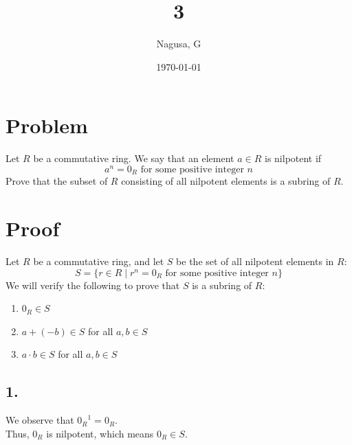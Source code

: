 \documentclass[11pt, a4paper]{article}
\title{3}
\author{Nagusa, G}
\date{\today}
\begin{document}
\maketitle

\section*{Problem}
Let $R$ be a commutative ring.
We say that an element $a \in R$ is nilpotent if
\[
a^n = 0_R \text{ for some positive integer } n
\]
Prove that the subset of $R$ consisting of all nilpotent elements is a subring of $R$.

\section*{Proof}
Let $R$ be a commutative ring, and let $S$ be the set of all nilpotent elements in $R$:
\[ S = \{ r \in R \mid r^n = 0_R \text{ for some positive integer } n \} \] 
We will verify the following to prove that $S$ is a subring of $R$:
\begin{enumerate}
    \item $0_R \in S$
    \item $a + (-b) \in S$ for all $a, b \in S$
    \item $a \cdot b \in S$ for all $a, b \in S$
\end{enumerate}

\subsection*{1.}
We observe that ${0_R}^1 = 0_R$. \\
Thus, $0_R$ is nilpotent, which means $0_R \in S$.
\end{document}
